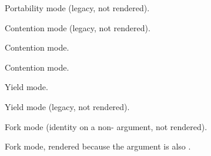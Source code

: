 \medbreak
\label{Oxcaml--val-mode_nonportable}\begin{ocamlindent}Portability mode (legacy, not rendered).\end{ocamlindent}%
\medbreak
\label{Oxcaml--val-mode_uncontended}\begin{ocamlindent}Contention mode (legacy, not rendered).\end{ocamlindent}%
\medbreak
\label{Oxcaml--val-mode_shared}\begin{ocamlindent}Contention mode.\end{ocamlindent}%
\medbreak
\label{Oxcaml--val-mode_contended}\begin{ocamlindent}Contention mode.\end{ocamlindent}%
\medbreak
\label{Oxcaml--val-mode_yielding}\begin{ocamlindent}Yield mode.\end{ocamlindent}%
\medbreak
\label{Oxcaml--val-mode_unyielding}\begin{ocamlindent}Yield mode (legacy, not rendered).\end{ocamlindent}%
\medbreak
\label{Oxcaml--val-mode_forkable}\begin{ocamlindent}Fork mode (identity on a non- argument, not rendered).\end{ocamlindent}%
\medbreak
\label{Oxcaml--val-mode_local_forkable}\begin{ocamlindent}Fork mode, rendered because the argument is also .\end{ocamlindent}%
\medbreak
